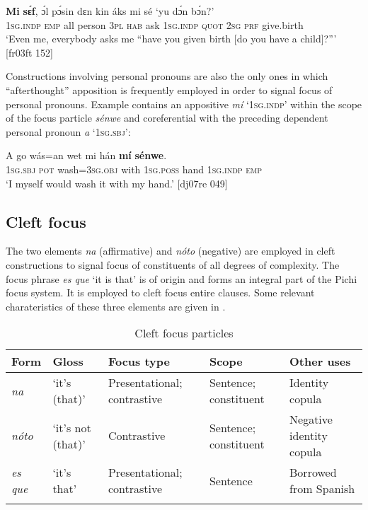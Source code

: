 \ea%
    \label{ex:key:688}
    \gll \textbf{Mi}    \textbf{sɛ́f},  ɔ́l  pɔ́sin  dɛn  kin  áks  mi    sé
‘yu  dɔ́n  bɔ́n?’\\
\textsc{1sg.indp}  \textsc{emp}  all  person  \textsc{3pl}  \textsc{hab}  ask  \textsc{1sg.indp}  \textsc{quot}
\textsc{2sg}  \textsc{prf}  give.birth\\

\glt ‘Even me, everybody asks me “have you given birth 
[do you have a child]?”' [fr03ft 152]
\z

Constructions involving personal pronouns are also the only ones in which “afterthought” apposition is frequently employed in order to signal focus of personal pronouns. Example  contains an appositive \textit{mí} ‘\textsc{1sg.indp’} within the scope of the focus particle \textit{sénwe} and\textit{} coreferential with the preceding dependent personal pronoun \textit{a} ‘\textsc{1sg.sbj’}:


\ea%
    \label{ex:key:689}
    \gll A    go  wás=an    wet  mi    hán    \textbf{mí} \textbf{sénwe}.\\
\textsc{1sg.sbj}  \textsc{pot}  wash=\textsc{3sg.obj}  with  \textsc{1sg.poss}  hand  \textsc{1sg.indp}  \textsc{emp}\\

\glt ‘\textsc{I} myself would wash it with my hand.’ [dj07re 049]
\z

\subsection{Cleft focus} \label{sec:7.4.3}

The two elements \textit{na} (affirmative) and \textit{nóto} (negative) are employed in cleft constructions to signal focus of constituents of all degrees of complexity. The focus phrase \textit{es que} ‘it is that’ is of  origin and forms an integral part of the Pichi focus system. It is employed to cleft focus entire clauses. Some relevant charateristics of these three elements are given in .

\begin{table}
\caption{Cleft focus particles}
\label{tab:key:7.6}

\begin{tabularx}{\textwidth}{llQQQ}
\lsptoprule

Form & Gloss & Focus type & Scope & Other uses\\
\midrule
\itshape na & ‘it’s (that)’ & Presentational; contrastive & Sentence; constituent & Identity copula\\
\tablevspace
\itshape nóto & ‘it’s not (that)’ & Contrastive & Sentence; constituent & Negative identity copula\\
\tablevspace
  \itshape es que & ‘it’s that’ & Presentational; contrastive & Sentence & Borrowed from Spanish\\
\lspbottomrule
\end{tabularx}
\end{table}
